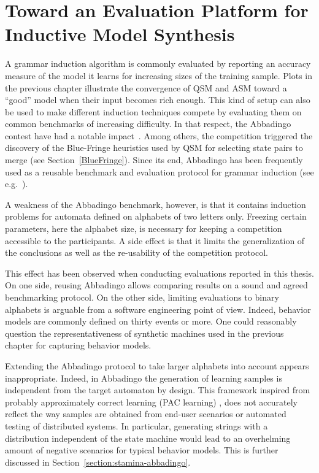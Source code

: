 \chapter{Toward an Evaluation Platform for Inductive Model Synthesis\label{chapter:stamina}}

A grammar induction algorithm is commonly evaluated by reporting an accuracy measure of the model it learns for increasing sizes of the training sample. Plots in the previous chapter illustrate the convergence of QSM and ASM toward a ``good'' model when their input becomes rich enough. This kind of setup can also be used to make different induction techniques compete by evaluating them on common benchmarks of increasing difficulty. In that respect, the Abbadingo contest have had a notable impact~\cite{Lang:1998}. Among others, the competition triggered the discovery of the Blue-Fringe heuristics used by QSM for selecting state pairs to merge (see Section~\ref{BlueFringe}). Since its end, Abbadingo has been frequently used as a reusable benchmark and evaluation protocol for grammar induction (see e.g.~\cite{Lucas:2003, Bongard:2005, Lucas:2005, Adriaans:2006, Dupont:2008, Lambeau:2008, Heule:2010}).

A weakness of the Abbadingo benchmark, however, is that it contains induction problems for automata defined on alphabets of two letters only. Freezing certain parameters, here the alphabet size, is necessary for keeping a competition accessible to the participants. A side effect is that it limits the generalization of the conclusions as well as the re-usability of the competition protocol. 

This effect has been observed when conducting evaluations reported in this thesis. On one side, reusing Abbadingo allows comparing results on a sound and agreed benchmarking protocol. On the other side, limiting evaluations to binary alphabets is arguable from a software engineering point of view. Indeed, behavior models are commonly defined on thirty events or more. One could reasonably question the representativeness of synthetic machines used in the previous chapter for capturing behavior models.

Extending the Abbadingo protocol to take larger alphabets into account appears inappropriate. Indeed, in Abbadingo the generation of learning samples is independent from the target automaton by design. This framework inspired from probably approximately correct learning (PAC learning) \cite{Valiant:1984}, does not accurately reflect the way samples are obtained from end-user scenarios or automated testing of distributed systems. In particular, generating strings with a distribution independent of the state machine would lead to an overhelming amount of negative scenarios for typical behavior models. This is further discussed in Section~\ref{section:stamina-abbadingo}.

